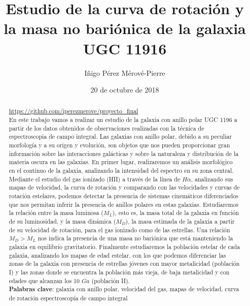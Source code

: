\documentclass{article}
\newcommand{\hal}{$H\alpha$}
\begin{document}
\title{Estudio de la curva de rotación y la masa no bariónica de la galaxia UGC 11916}
\author{Iñigo Pérez Mérové-Pierre}
\date{20 de octubre de 2018}
\maketitle

\begin{abstract}
\url{https://github.com/iperezmerove/proyecto_final}\\En este trabajo vamos a realizar un estudio de la galaxia con anillo polar UGC 1196 a partir de los datos obtenidos de observaciones realizadas con la técnica de espectroscopia de campo integral. Las galaxias con anillo polar, debido a su peculiar morfología y a su origen y evolución, son objetos que nos pueden proporcionar gran información sobre las interacciones galácticas y sobre la naturaleza y distribución de la materia oscura en las galaxias. En primer lugar, realizaremos un análisis morfológico en el continuo de la galaxia, analizando la intensidad del espectro en su zona central. Mediante el estudio del gas ionizado (HII) a través de la línea de \hal, analizando sus mapas de velocidad, la curva de rotación y comparando con las velocidades y curvas de rotación estelares, podemos detectar la presencia de sistemas cinemáticos diferenciados que nos permitan inferir la presencia de anillos polares en estas galaxias. Estudiaremos la relación entre la masa luminosa ($M_{L}$), esto es, la masa total de la galaxia en función de su luminosidad, y la masa dinámica ($M_{D}$), la masa estimada de la galaxia a partir de su velocidad de rotación, para el gas ionizado como de las estrellas. Una relación $M_{D} > M_{L}$ nos indica la presencia de una masa no bariónica que está manteniendo la galaxia en equilibrio gravitatorio. Finalmente estudiaremos la población estelar de cada galaxia, analizando los mapas de edad estelar, con los que podemos diferenciar las zonas de la galaxia con presencia de estrellas jóvenes con mayor metalicidad (población I) y las zonas donde se encuentra la población más vieja, de baja metalicidad y con edades que alcanzan los 10 $Ga$ (población II).\\\textbf{Palabras clave}: galaxia con anillo polar, velocidad del gas, mapas de velocidad, curva de rotación espectroscopía de campo integral 
\end{abstract}
\end{document}
